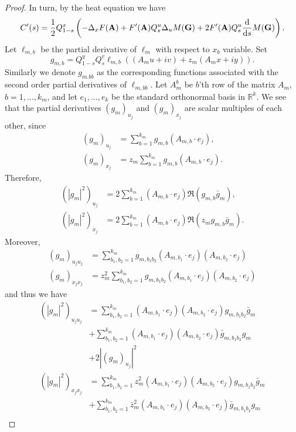 \documentclass[9pt, a4paper]{amsart}
\newcommand{\1}{{\chi_{}}}%
\numberwithin{equation}{section}
\begin{document}
\begin{proof}
In turn, by the heat equation we have
		\begin{equation*}
			C'(s)=\frac{1}{2}Q_{1-s}^x\left(-\Delta_xF({\bf{A}})+F'({\bf{A}})Q_s^u\Delta_uM({\bf{G}}) +2F'({\bf{A}}) Q_s^u\frac{\mathrm{d}}{\mathrm{d} s} M({\bf{G}})\right).
		\end{equation*}
		Let $\ell_{m,b}$ be the partial derivative of $\ell_m$ with respect to $x_b$ variable. Set
		\begin{equation*}
			g_{m,b}=Q_{1-s}^yQ_s^v    \ell_{m,b}((A_m u+iv)+z_m(A_m x+iy)).
		\end{equation*}
	Similarly we denote $g_{m.bb}$ as the corresponding functions associated with the second order partial derivatives of $\ell_{m,bb}$. Let $A_m^b$ be $b$'th row of the matrix $A_m$, $b=1,\ldots,k_m$,  and let $ e_1, \ldots, e_k $ be the standard orthonormal basis in $ \mathbb{R}^k$.	We see that the partial derivatives $(g_m)_{u_j}$ and $(g_m)_{x_j}$ are scalar multiples of each other, since
		\begin{align*}
			(g_m)_{u_j}&=\sum_{b=1}^{k_m}g_{m,b}(A_{m,b}\cdot e_j),\\
			(g_m)_{x_j}&=z_m \sum_{b=1}^{k_m}g_{m,b}(A_{m,b}\cdot e_j).
		\end{align*}
		Therefore,
	\begin{align*}
		(|g_m|^{2})_{u_j}&= 2\sum_{b=1}^{k_m}(A_{m,b}\cdot e_j) \Re(g_{m,b} \bar{g}_m ),  \\ 
		(|g_m|^{2})_{x_j}&=2\sum_{b=1}^{k_m}(A_{m,b}\cdot e_j) \Re(z_m g_{m,b} \bar{g}_m ).
	\end{align*}
	Moreover,
	\begin{align*}
		(g_m)_{u_ju_j}&=\sum_{b_1, b_2=1}^{k_m}g_{m,b_1b_2}(A_{m,b_1}\cdot e_j)(A_{m,b_2}\cdot e_j)\\
		(g_m)_{x_jx_j}&=z_m^2\sum_{b_1, b_2=1}^{k_m}g_{m,b_1b_2}(A_{m,b_1}\cdot e_j)(A_{m,b_2}\cdot e_j)
	\end{align*}
and thus we have
		\begin{align*}
			(|g_m|^2)_{u_ju_j}&=  \sum_{b_1, b_2=1}^{k_m}(A_{m,b_1}\cdot e_j)(A_{m,b_2}\cdot e_j)g_{m,b_1b_2}\bar{g}_m\\
			&+\sum_{b_1, b_2=1}^{k_m}(A_{m,b_1}\cdot e_j)(A_{m,b_2}\cdot e_j)\bar{g}_{m,b_1b_2}g_m  \\
			&+2|(g_m)_{u_j}|^2  \\
			(|g_m|^{2})_{x_jx_j}&=  \sum_{b_1, b_2=1}^{k_m}z_m^2(A_{m,b_1}\cdot e_j)(A_{m,b_2}\cdot e_j)g_{m,b_1b_2}\bar{g}_m\\
			&+\sum_{b_1, b_2=1}^{k_m}\bar{z}_m^2(A_{m,b_1}\cdot e_j)(A_{m,b_2}\cdot e_j)\bar{g}_{m,b_1b_2}g_m\\

\end{align*}
\end{proof}
\end{document}
